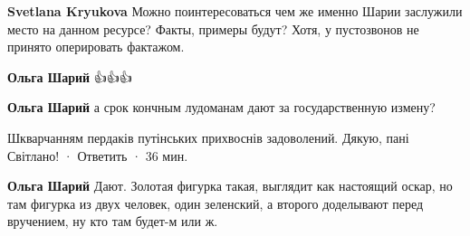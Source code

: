 \begin{itemize}
\begin{itemize}
 
\textbf{Svetlana Kryukova} Можно поинтересоваться чем же именно Шарии заслужили место на данном ресурсе? Факты, примеры будут? Хотя, у пустозвонов не принято оперировать фактажом.

 
\textbf{Ольга Шарий} 👍👍👍

 
\textbf{Ольга Шарий} а срок кончным лудоманам дают за государственную измену?

 
Шкварчанням пердаків путінських прихвоснів задоволений. Дякую, пані Світлано!
 · Ответить · 36 мин.
 
\textbf{Ольга Шарий} Дают. Золотая фигурка такая, выглядит как настоящий оскар, но там фигурка из двух человек, один зеленский, а второго доделывают перед вручением, ну кто там будет-м или ж.

\end{itemize}
\end{itemize}

